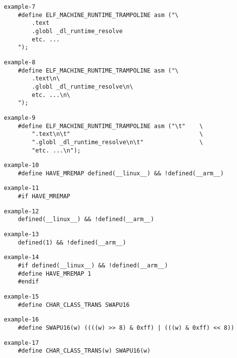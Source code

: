\documentclass{jsarticle}
\begin{document}
\setlength{\baselineskip}{12pt}

\begin{verbatim}
example-7
    #define ELF_MACHINE_RUNTIME_TRAMPOLINE asm ("\
        .text
        .globl _dl_runtime_resolve
        etc. ...
    ");
\end{verbatim}

\begin{verbatim}
example-8
    #define ELF_MACHINE_RUNTIME_TRAMPOLINE asm ("\
        .text\n\
        .globl _dl_runtime_resolve\n\
        etc. ...\n\
    ");
\end{verbatim}

\begin{verbatim}
example-9
    #define ELF_MACHINE_RUNTIME_TRAMPOLINE asm ("\t"    \
        ".text\n\t"                                     \
        ".globl _dl_runtime_resolve\n\t"                \
        "etc. ...\n");
\end{verbatim}

\vspace{8pt}

\begin{verbatim}
example-10
    #define HAVE_MREMAP defined(__linux__) && !defined(__arm__)
\end{verbatim}

\begin{verbatim}
example-11
    #if HAVE_MREMAP
\end{verbatim}

\begin{verbatim}
example-12
    defined(__linux__) && !defined(__arm__)
\end{verbatim}

\begin{verbatim}
example-13
    defined(1) && !defined(__arm__)
\end{verbatim}

\begin{verbatim}
example-14
    #if defined(__linux__) && !defined(__arm__)
    #define HAVE_MREMAP 1
    #endif
\end{verbatim}

\vspace{8pt}

\begin{verbatim}
example-15
    #define CHAR_CLASS_TRANS SWAPU16
\end{verbatim}

\begin{verbatim}
example-16
    #define SWAPU16(w) ((((w) >> 8) & 0xff) | (((w) & 0xff) << 8))
\end{verbatim}

\begin{verbatim}
example-17
    #define CHAR_CLASS_TRANS(w) SWAPU16(w)
\end{verbatim}
\end{document}
